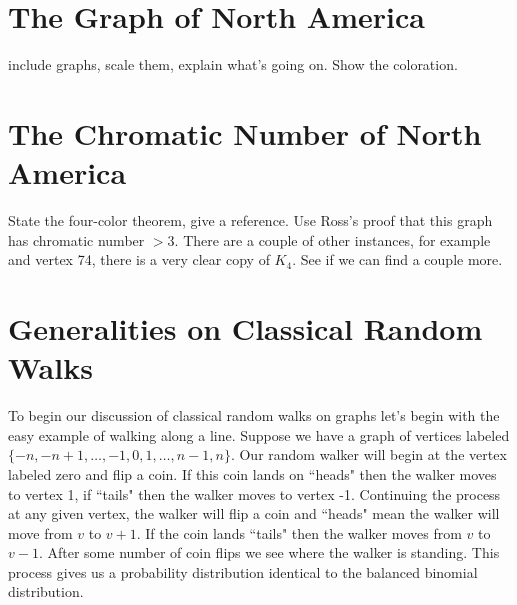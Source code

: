 \documentclass{article}
\theoremstyle{definition}
\theoremstyle{remark}
\numberwithin{equation}{section}
\begin{document}
\section{The Graph of North America}

include graphs, scale them, explain what's going on.  Show the coloration. 



\section{The Chromatic Number of North America}

State the four-color theorem, give a reference.  Use Ross's proof that this graph has chromatic number $>3$.  There are a couple of other instances, for example and vertex 74, there is a very clear copy of $K_4$.  See if we can find a couple more. 



\section{Generalities on Classical Random Walks}


To begin our discussion of classical random walks on graphs let's begin with the easy example of walking along a line.  Suppose we have a graph of vertices labeled $\{-n,-n+1,\dots,-1,0,1,\dots,n-1,n\}$.  Our random walker will begin at the vertex labeled zero and flip a coin.  If this coin lands on ``heads" then the walker moves to vertex 1, if ``tails" then the walker moves to vertex -1.  Continuing the process at any given vertex, the walker will flip a coin and ``heads" mean the walker will move from $v$ to $v+1$.  If the coin lands ``tails" then the walker moves from $v$ to $v-1$. After some number of coin flips we see where the walker is standing.  This process gives us a probability distribution identical to the balanced binomial distribution.  
\begin{center} 
\end{center}
 
\end{document}
